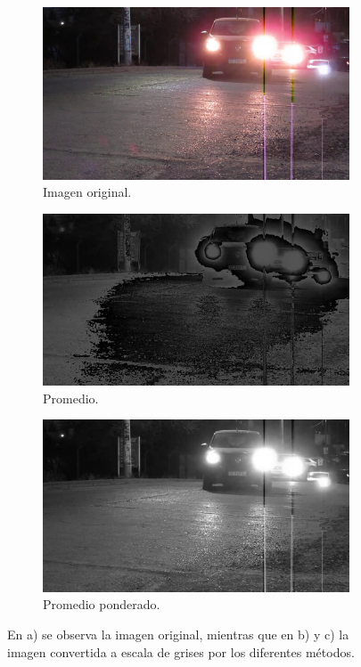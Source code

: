 \begin{figure}
    \centering
    \begin{subfigure}[b]{0.3\textwidth}
        \centering
        \includegraphics[width=\textwidth]{imgs/escala-grises-original.jpg}
        \caption{Imagen original.}
    \end{subfigure}
    \hfill
    \begin{subfigure}[b]{.3\textwidth}
        \centering
        \includegraphics[width=\textwidth]{imgs/escala-grises-promedio.jpg}
        \caption{Promedio.}
    \end{subfigure}
    \hfill
    \begin{subfigure}[b]{.3\textwidth}
        \centering
        \includegraphics[width=\textwidth]{imgs/escala-grises-sensibilidad.jpg}
        \caption{Promedio ponderado.}
    \end{subfigure}
    \hfill
    \caption{En a) se observa la imagen original, mientras que en b) y c) la imagen convertida a escala de grises por los diferentes métodos.}
    \label{fig:comparacion-grises}
\end{figure}

